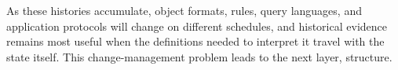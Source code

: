 As these histories accumulate, object formats,  rules, query languages, and application protocols will change on different schedules, and historical evidence remains most useful when the definitions needed to interpret it travel with the state itself. This change-management problem leads to the next layer,  structure.
